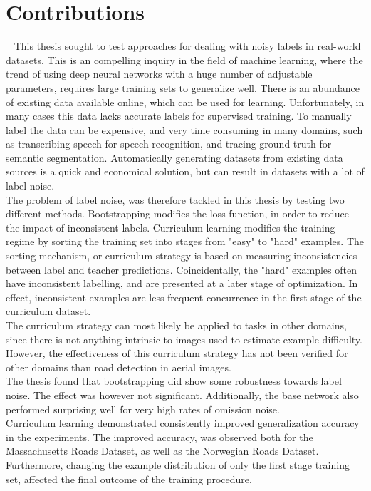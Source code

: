 \section{Contributions}~\label{cont}
\label{sec:Contributions}
This thesis sought to test approaches for dealing with noisy labels in real-world datasets. This is an compelling inquiry in the field of machine learning, where the trend of using deep neural networks with a huge number of adjustable parameters, requires large training sets to generalize well. There is an abundance of existing data available online, which can be used for learning. Unfortunately, in many cases this data lacks accurate labels for supervised training. To manually label the data can be expensive, and very time consuming in many domains, such as transcribing speech for speech recognition, and tracing ground truth for semantic segmentation. Automatically generating datasets from existing data sources is a quick and economical solution, but can result in datasets with a lot of label noise.\\

The problem of label noise, was therefore tackled in this thesis by testing two different methods. Bootstrapping modifies the loss function, in order to reduce the impact of inconsistent labels. Curriculum learning modifies the training regime by sorting the training set into stages from "easy" to "hard" examples. The sorting mechanism, or curriculum strategy is based on measuring inconsistencies between label and teacher predictions. Coincidentally, the "hard" examples often have inconsistent labelling, and are presented at a later stage of optimization. In effect, inconsistent examples are less frequent concurrence in the first stage of the curriculum dataset.\\
 
The curriculum strategy can most likely be applied to tasks in other domains, since there is not anything intrinsic to images used to estimate example difficulty. However, the effectiveness of this curriculum strategy has not been verified for other domains than road detection in aerial images.\\

The thesis found that bootstrapping did show some robustness towards label noise. The effect was however not significant. Additionally, the base network also performed surprising well for very high rates of omission noise.\\

Curriculum learning demonstrated consistently improved generalization accuracy in the experiments. The improved accuracy, was observed both for the Massachusetts Roads Dataset, as well as the Norwegian Roads Dataset. Furthermore, changing the example distribution of only the first stage training set, affected the final outcome of the training procedure.\\

